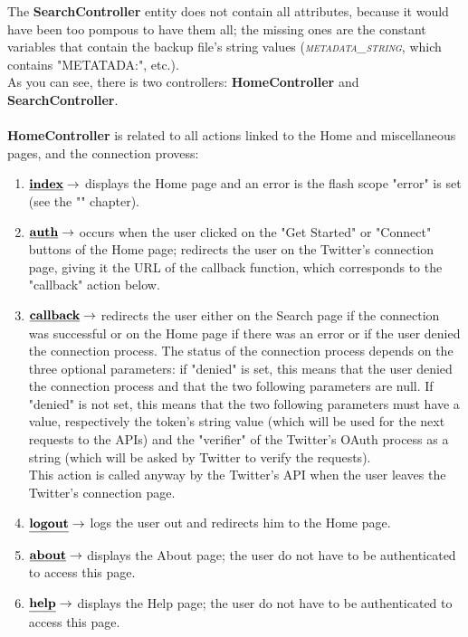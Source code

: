 \documentclass[a4paper,11pt]{report}
\begin{document}
The \textbf{SearchController} entity does not contain all attributes, because it would have been too pompous to have them all; the missing ones are the constant variables that contain the backup file's string values (\textit{\textsc{metadata\_string}}, which contains "METATADA:", etc.).\\
As you can see, there is two controllers: \textbf{HomeController} and \textbf{SearchController}.\\\\
\textbf{HomeController} is related to all actions linked to the Home and miscellaneous pages, and the connection provess:
\begin{enumerate}
\item $\textbf{\underline{index}}\to$ displays the Home page and an error is the flash scope "error" is set (see the "" chapter).
\item $\textbf{\underline{auth}}\to$ occurs when the user clicked on the "Get Started" or "Connect" buttons of the Home page; redirects the user on the Twitter's connection page, giving it the URL of the callback function, which corresponds to the "callback" action below.
\item $\textbf{\underline{callback}}\to$ redirects the user either on the Search page if the connection was successful or on the Home page if there was an error or if the user denied the connection process. The status of the connection process depends on the three optional parameters: if "denied" is set, this means that the user denied the connection process and that the two following parameters are null. If "denied" is not set, this means that the two following parameters must have a value, respectively the token's string value (which will be used for the next requests to the APIs) and the "verifier" of the Twitter's OAuth process as a string (which will be asked by Twitter to verify the requests).\\
This action is called anyway by the Twitter's API when the user leaves the Twitter's connection page.
\item $\textbf{\underline{logout}}\to$ logs the user out and redirects him to the Home page.
\item $\textbf{\underline{about}}\to$ displays the About page; the user do not have to be authenticated to access this page.
\item $\textbf{\underline{help}}\to$ displays the Help page; the user do not have to be authenticated to access this page.
\end{enumerate}
\end{document}
